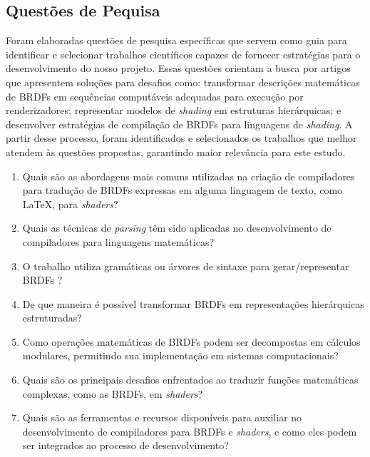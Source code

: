 %
%


%








\subsection{Questões de Pequisa}  \label{questoes-pesquisa}


Foram elaboradas questões de pesquisa específicas que servem como guia para identificar e selecionar trabalhos científicos capazes de fornecer estratégias para o desenvolvimento do nosso projeto. Essas questões orientam a busca por artigos que apresentem soluções para desafios como: transformar descrições matemáticas de BRDFs em sequências computáveis adequadas para execução por renderizadores; representar modelos de \textit{shading} em estruturas hierárquicas; e desenvolver estratégias de compilação de BRDFs para linguagens de \textit{shading}. A partir desse processo, foram identificados e selecionados os trabalhos que melhor atendem às questões propostas, garantindo maior relevância para este estudo.


\begin{enumerate}
  \item Quais são as abordagens mais comuns utilizadas na criação de compiladores para tradução de BRDFs expressas em alguma linguagem de texto, como \LaTeX{}, para \textit{shaders}?

  \item Quais as técnicas de \textit{parsing} têm sido aplicadas no desenvolvimento de compiladores para linguagens matemáticas?

  \item O trabalho utiliza gramáticas ou árvores de sintaxe para gerar/representar BRDFs ?

  \item De que maneira é possível transformar BRDFs em representações hierárquicas estruturadas?

  \item Como operações matemáticas de BRDFs podem ser decompostas em cálculos modulares, permitindo sua implementação em sistemas computacionais?

 \item Quais são os principais desafios enfrentados ao traduzir funções matemáticas complexas, como as BRDFs, em \textit{shaders}?

 \item Quais são as ferramentas e recursos disponíveis para auxiliar no desenvolvimento de compiladores para BRDFs e \textit{shaders}, e como eles podem ser integrados ao processo de desenvolvimento?

\end{enumerate}




